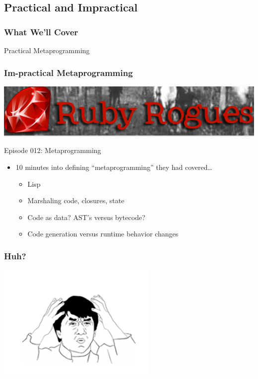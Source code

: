 \documentclass[slidestop,compress,mathserif]{beamer}
\begin{document}
\subsection{Practical and Impractical }

\begin{frame}
	\frametitle{What We'll Cover}
	\begin{center}
		Practical Metaprogramming
	\end{center}
\end{frame}

\begin{frame}
	\frametitle{\textbf{Im}-practical Metaprogramming}
	\pause
	\begin{center}
		\includegraphics[scale=0.3]{img/rubyrogues.png}
	\end{center}
	\vskip 0.25cm
	Episode 012:  Metaprogramming
	\vskip 0.25cm
	\begin{itemize}
		\pause
		\item 10 minutes into defining ``metaprogramming'' they had covered{\ldots}
		\begin{itemize}
			\item Lisp
			\pause
			\item Marshaling code, closures, state 
			\pause
			\item Code as data?  AST's versus bytecode?
			\pause
			\item Code generation versus runtime behavior changes
		\end{itemize}
	\end{itemize}
\end{frame}

\begin{frame}
	\frametitle{Huh?}
	\begin{center}
		\includegraphics[scale=0.5]{img/chan.png}
	\end{center}
\end{frame}
\end{document}
